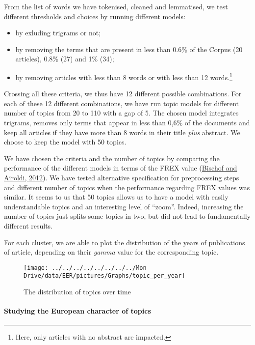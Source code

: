 \documentclass[
  12pt,
  onecolumn]{article}
\providecommand{\tightlist}{%
  \setlength{\itemsep}{0pt}\setlength{\parskip}{0pt}}
\begin{document}
From the list of words we have tokenised, cleaned and lemmatised, we
test different thresholds and choices by running different models:

\begin{itemize}
\tightlist
\item
  by exluding trigrams or not;
\item
  by removing the terms that are present in less than 0.6\% of the
  Corpus (20 articles), 0.8\% (27) and 1\% (34);
\item
  by removing articles with less than 8 words or with less than 12
  words.\footnote{Here, only articles with no abstract are impacted.}
\end{itemize}

Crossing all these criteria, we thus have 12 different possible
combinations. For each of these 12 different combinations, we have run
topic models for different number of topics from 20 to 110 with a gap of
5. The chosen model integrates trigrams, removes only terms that appear
in less than 0,6\% of the documents and keep all articles if they have
more than 8 words in their title \emph{plus} abstract. We choose to keep
the model with 50 topics.

We have chosen the criteria and the number of topics by comparing the
performance of the different models in terms of the FREX value
(\protect\hyperlink{ref-bischof2012}{Bischof and Airoldi, 2012}). We
have tested alternative specification for preprocessing steps and
different number of topics when the performance regarding FREX values
was similar. It seems to us that 50 topics allows us to have a model
with easily understandable topics and an interesting level of ``zoom''.
Indeed, increasing the number of topics just splits some topics in two,
but did not lead to fundamentally different results.

For each cluster, we are able to plot the distribution of the years of
publications of article, depending on their \emph{gamma} value for the
corresponding topic.

\begin{figure}[h]

{\centering \texttt{[image: ../../../../../../../../Mon Drive/data/EER/pictures/Graphs/topic\_per\_year]} 

}

\caption{The distribution of topics over time}\label{fig:plot-topic-year}
\end{figure}

\hypertarget{studying-the-european-character-of-topics}{%
\paragraph*{Studying the European character of
topics}\label{studying-the-european-character-of-topics}}
\end{document}
